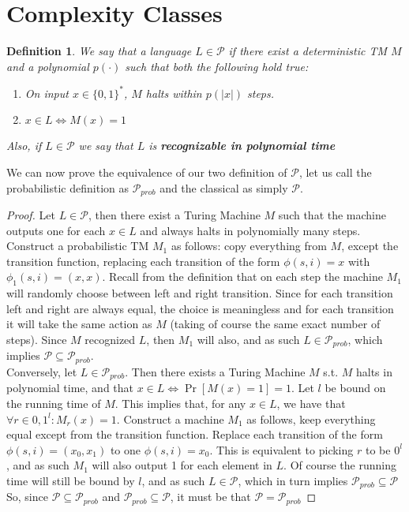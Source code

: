 \documentclass{article}
\newtheorem{definition}{Definition}
\begin{document}
\section{Complexity Classes}
\begin{definition}
We say that a language $L \in \mathcal{P}$ if there exist a deterministic TM $M$ and a polynomial $p(\cdot)$ such that both the following hold true:
\begin{enumerate}
    \item On input $x \in \{0, 1\}^*$, $M$ halts within $p(|x|)$ steps.
    \item $x \in L \iff M(x) = 1$
\end{enumerate}
Also, if $L \in \mathcal{P}$ we say that $L$ is \textbf{recognizable in polynomial time}
\end{definition}

We can now prove the equivalence of our two definition of $\mathcal{P}$, let us call the probabilistic definition as $\mathcal{P}_{prob}$ and the classical as simply $\mathcal{P}$.

\begin{proof}
Let $L \in \mathcal{P}$, then there exist a Turing Machine $M$ such that the machine outputs one for each $x \in L$ and always halts in polynomially many steps. 
Construct a probabilistic TM $M_1$ as follows: copy everything from $M$, except the transition function, replacing each transition of the form $\phi(s, i) = x$ with $\phi_1(s, i) = (x, x)$. Recall from the definition that on each step the machine $M_1$ will randomly choose between left and right transition. Since for each transition left and right are always equal, the choice is meaningless and for each transition it will take the same action as $M$ (taking of course the same exact number of steps). Since $M$ recognized $L$, then $M_1$ will also, and as such $L \in \mathcal{P}_{prob}$, which implies $\mathcal{P} \subseteq \mathcal{P}_{prob}$. \\

Conversely, let $L \in \mathcal{P}_{prob}$. Then there exists a Turing Machine $M$ s.t. $M$ halts in polynomial time, and that $ x \in L \iff \Pr[M(x) = 1] = 1$. Let $l$ be bound on the running time of $M$. This implies that, for any $x \in L$, we have that $\forall r \in {0,1}^l : M_r(x) = 1$. Construct a machine $M_1$ as follows, keep everything equal except from the transition function. Replace each transition of the form $\phi(s, i) = (x_0, x_1)$ to one $\phi(s, i) = x_0$. This is equivalent to picking $r$ to be $0^l$, and as such $M_1$ will also output 1 for each element in $L$. Of course the running time will still be bound by $l$, and as such $L \in \mathcal{P}$, which in turn implies $\mathcal{P}_{prob} \subseteq \mathcal{P}$ \\

So, since $\mathcal{P} \subseteq \mathcal{P}_{prob}$ and $\mathcal{P}_{prob} \subseteq \mathcal{P}$, it must be that $\mathcal{P} = \mathcal{P}_{prob}$
\end{proof}
\end{document}

